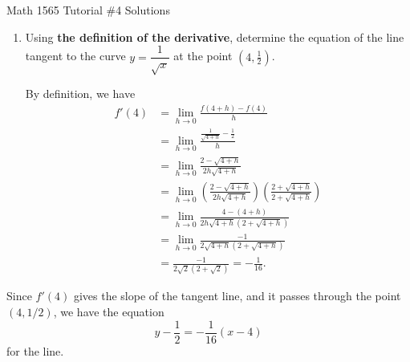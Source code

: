 \documentclass[12pt]{article}
\begin{document}
\begin{center}
Math 1565 Tutorial \#4 Solutions
\end{center}
\begin{enumerate}
 \item  Using \textbf{the definition of the derivative}, determine the equation of the line tangent to the curve $y=\dfrac{1}{\sqrt{x}}$ at the point $(4,\frac{1}{2})$.
 
\bigskip

By definition, we have
\begin{align*}
f'(4) & = \lim_{h\to 0}\frac{f(4+h)-f(4)}{h}\\
& = \lim_{h\to 0}\frac{\frac{1}{\sqrt{4+h}}-\frac{1}{2}}{h}\\
& = \lim_{h\to 0}\frac{2-\sqrt{4+h}}{2h\sqrt{4+h}}\\
& = \lim_{h\to 0}\left(\frac{2-\sqrt{4+h}}{2h\sqrt{4+h}}\right)\left(\frac{2+\sqrt{4+h}}{2+\sqrt{4+h}}\right)\\
& = \lim_{h\to 0}\frac{4-(4+h)}{2h\sqrt{4+h}(2+\sqrt{4+h})}\\
& = \lim_{h\to 0}\frac{-1}{2\sqrt{4+h}(2+\sqrt{4+h})}\\
& = \frac{-1}{2\sqrt{2}(2+\sqrt{2})} = -\frac{1}{16}.
\end{align*}
\end{enumerate}
Since $f'(4)$ gives the slope of the tangent line, and it passes through the point $(4,1/2)$, we have the equation
\[
y-\frac{1}{2} = -\frac{1}{16}(x-4)
\]
for the line.
\end{document}
